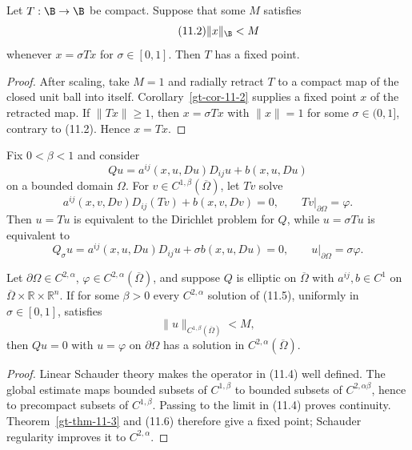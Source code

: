 \begin{theorem}
\label{gt-thm-11-3}
Let $T:\B\to\B$ be compact. Suppose that some $M$ satisfies
\begin{equation}
\tag{11.2}
\|x\|_{\B}<M
\end{equation}
whenever $x=\sigma Tx$ for $\sigma\in[0,1]$. Then $T$ has a fixed point.
\end{theorem}
\begin{proof}
\sketch After scaling, take $M=1$ and radially retract $T$ to a compact map
of the closed unit ball into itself. Corollary~\ref{gt-cor-11-2} supplies a
fixed point $x$ of the retracted map. If $\|Tx\|\geq1$, then
$x=\sigma Tx$ with $\|x\|=1$ for some $\sigma\in(0,1]$, contrary to (11.2).
Hence $x=Tx$.
\end{proof}

Fix $0<\beta<1$ and consider
\begin{equation}
\tag{11.3}
Qu=a^{ij}(x,u,Du)D_{ij}u+b(x,u,Du)
\end{equation}
on a bounded domain $\Omega$. For $v\in C^{1,\beta}(\overline\Omega)$,
let $Tv$ solve
\begin{equation}
\tag{11.4}
a^{ij}(x,v,Dv)D_{ij}(Tv)+b(x,v,Dv)=0,
\qquad Tv|_{\partial\Omega}=\varphi.
\end{equation}
Then $u=Tu$ is equivalent to the Dirichlet problem for $Q$, while
$u=\sigma Tu$ is equivalent to
\begin{equation}
\tag{11.5}
Q_\sigma u=a^{ij}(x,u,Du)D_{ij}u+\sigma b(x,u,Du)=0,
\qquad u|_{\partial\Omega}=\sigma\varphi.
\end{equation}

\begin{theorem}
\label{gt-thm-11-4}
Let $\partial\Omega\in C^{2,\alpha}$,
$\varphi\in C^{2,\alpha}(\overline\Omega)$, and suppose $Q$ is elliptic on
$\overline\Omega$ with $a^{ij},b\in C^1$ on
$\overline\Omega\times\mathbb R\times\mathbb R^n$. If for some $\beta>0$
every $C^{2,\alpha}$ solution of (11.5), uniformly in $\sigma\in[0,1]$,
satisfies
\begin{equation}
\tag{11.6}
\|u\|_{C^{1,\beta}(\overline\Omega)}<M,
\end{equation}
then $Qu=0$ with $u=\varphi$ on $\partial\Omega$ has a solution in
$C^{2,\alpha}(\overline\Omega)$.
\end{theorem}
\begin{proof}
\sketch Linear Schauder theory makes the operator in (11.4) well defined.
The global estimate maps bounded subsets of $C^{1,\beta}$ to bounded subsets
of $C^{2,\alpha\beta}$, hence to precompact subsets of $C^{1,\beta}$.
Passing to the limit in (11.4) proves continuity. Theorem~\ref{gt-thm-11-3}
and (11.6) therefore give a fixed point; Schauder regularity improves it to
$C^{2,\alpha}$.
\end{proof}

